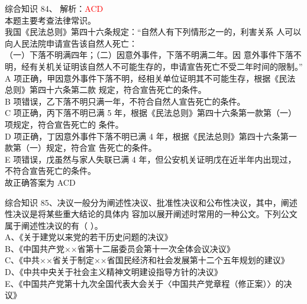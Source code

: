 \documentclass[aspectratio=169]{beamer}
\begin{document}
\begin{frame}[t]{综合知识}
    84、  解析：\textcolor{red}{ACD}\\
    {\scriptsize
    本题主要考查法律常识。\\
    我国《民法总则》第四十六条规定：“自然人有下列情形之一的，利害关系
    人可以向人民法院申请宣告该自然人死亡：\\
    （一）下落不明满四年；（二）因意外事件，下落不明满二年。因
    意外事件下落不明，经有关机关证明该自然人不可能生存的，申请宣告死亡不受二年时间的限制。”
    A 项正确，甲因意外事件下落不明，经相关单位证明其不可能生存，根据《民法总则》第四十六条第二款
    规定，符合宣告死亡的条件。\\
    B 项错误，乙下落不明只满一年，不符合自然人宣告死亡的条件。\\
    C 项正确，丙下落不明已满 5 年，根据《民法总则》第四十六条第一款第（一）项规定，符合宣告死亡的
    条件。\\
    D 项正确，丁因意外事件下落不明已满 4 年，根据《民法总则》第四十六条第一款第（一）规定，符合宣
    告死亡的条件。\\
    E 项错误，戊虽然与家人失联已满 4 年，但公安机关证明戊在近半年内出现过，不符合宣告死亡的条件。\\
    故正确答案为 ACD
    }
\end{frame}                           


\begin{frame}[t]{综合知识}
    85、决议一般分为阐述性决议、批准性决议和公布性决议，其中，阐述性决议是将某些重大结论的具体内
    容加以展开阐述时常用的一种公文。下列公文属于阐述性决议的有（ ）。                      \\
    A、《关于建党以来党的若干历史问题的决议》                                              \\
    B、《中国共产党××省第十二届委员会第十一次全体会议决议》                                \\
    C、《中共××省关于制定××省国民经济和社会发展第十二个五年规划的建议》                    \\
    D、《中共中央关于社会主义精神文明建设指导方针的决议》                                  \\
    E、《中国共产党第十九次全国代表大会关于〈中国共产党章程（修正案）〉的决议》            \\
\end{frame}                           
\end{document}
